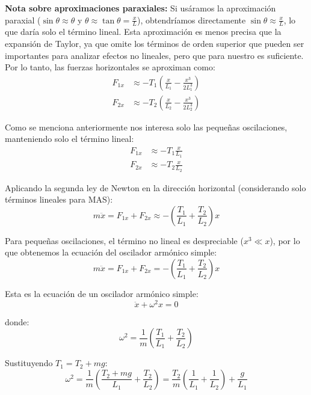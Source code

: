 \documentclass[
  11pt,
  letterpaper,
   addpoints,
   answers
  ]{exam}
\begin{document}
\begin{questions}
\begin{solution}
\textbf{Nota sobre aproximaciones paraxiales:} Si usáramos la aproximación paraxial ($\sin\theta \approx \theta$ y $\theta \approx \tan\theta = \frac{x}{L}$), obtendríamos directamente $\sin\theta \approx \frac{x}{L}$, lo que daría solo el término lineal. Esta aproximación es menos precisa que la expansión de Taylor, ya que omite los términos de orden superior que pueden ser importantes para analizar efectos no lineales, pero que para nuestro es suficiente. Por lo tanto, las fuerzas horizontales se aproximan como:
\begin{align}
F_{1x} &\approx -T_1 \left(\frac{x}{L_1} - \frac{x^3}{2L_1^3}\right) \\
F_{2x} &\approx -T_2 \left(\frac{x}{L_2} - \frac{x^3}{2L_2^3}\right)
\end{align}

Como se menciona anteriormente nos interesa solo las pequeñas oscilaciones, manteniendo solo el término lineal:
\begin{align}
F_{1x} &\approx -T_1 \frac{x}{L_1} \\
F_{2x} &\approx -T_2 \frac{x}{L_2}
\end{align}


Aplicando la segunda ley de Newton en la dirección horizontal (considerando solo términos lineales para MAS):
\begin{equation}
m\ddot{x} = F_{1x} + F_{2x} \approx -\left(\frac{T_1}{L_1} + \frac{T_2}{L_2}\right)x
\end{equation}


Para pequeñas oscilaciones, el término no lineal es despreciable ($x^3 \ll x$), por lo que obtenemos la ecuación del oscilador armónico simple:
\begin{equation}
m\ddot{x} = F_{1x} + F_{2x} = -\left(\frac{T_1}{L_1} + \frac{T_2}{L_2}\right)x
\end{equation}

Esta es la ecuación de un oscilador armónico simple:
\begin{equation}
\ddot{x} + \omega^2 x = 0
\end{equation}

donde:
\begin{equation}
\omega^2 = \frac{1}{m}\left(\frac{T_1}{L_1} + \frac{T_2}{L_2}\right)
\end{equation}

Sustituyendo $T_1 = T_2 + mg$:
\begin{equation}
\omega^2 = \frac{1}{m}\left(\frac{T_2 + mg}{L_1} + \frac{T_2}{L_2}\right) = \frac{T_2}{m}\left(\frac{1}{L_1} + \frac{1}{L_2}\right) + \frac{g}{L_1}
\end{equation}


\end{solution}
\end{questions}
\end{document}
